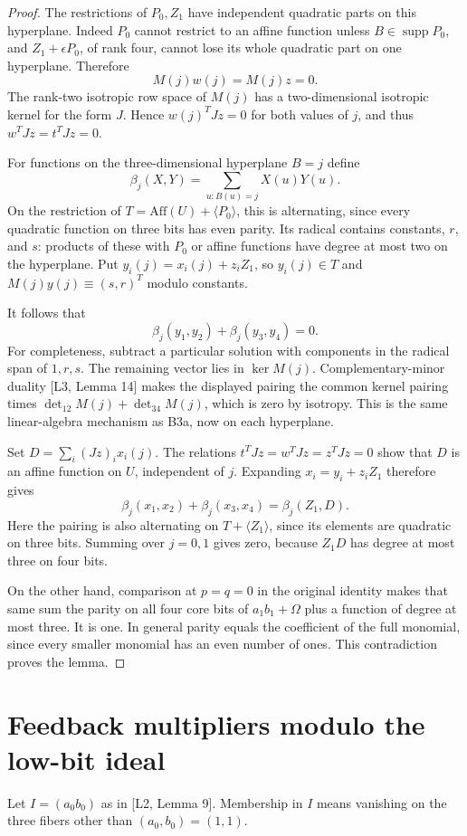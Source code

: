 \documentclass[11pt,a4paper]{article}
\newcommand{\Aff}{\mathrm{Aff}}
\newcommand{\supp}{\operatorname{supp}}
\begin{document}
\begin{proof}
The restrictions of $P_0,Z_1$ have independent quadratic parts on this hyperplane. Indeed $P_0$ cannot restrict to an affine function unless $B\in\supp P_0$, and $Z_1+\epsilon P_0$, of rank four, cannot lose its whole quadratic part on one hyperplane. Therefore
\[
M(j)w(j)=M(j)z=0.
\]
The rank-two isotropic row space of $M(j)$ has a two-dimensional isotropic kernel for the form $J$. Hence $w(j)^TJz=0$ for both values of $j$, and thus $w^TJz=t^TJz=0$.

For functions on the three-dimensional hyperplane $B=j$ define
\[
\beta_j(X,Y)=\sum_{u:B(u)=j}X(u)Y(u).
\]
On the restriction of $T=\Aff(U)+\langle P_0\rangle$, this is alternating, since every quadratic function on three bits has even parity. Its radical contains constants, $r$, and $s$: products of these with $P_0$ or affine functions have degree at most two on the hyperplane. Put $y_i(j)=x_i(j)+z_iZ_1$, so $y_i(j)\in T$ and $M(j)y(j)\equiv(s,r)^T$ modulo constants.

It follows that
\[
\beta_j(y_1,y_2)+\beta_j(y_3,y_4)=0.
\]
For completeness, subtract a particular solution with components in the radical span of $1,r,s$. The remaining vector lies in $\ker M(j)$. Complementary-minor duality [L3, Lemma 14] makes the displayed pairing the common kernel pairing times $\det_{12}M(j)+\det_{34}M(j)$, which is zero by isotropy. This is the same linear-algebra mechanism as B3a, now on each hyperplane.

Set $D=\sum_i(Jz)_i x_i(j)$. The relations $t^TJz=w^TJz=z^TJz=0$ show that $D$ is an affine function on $U$, independent of $j$. Expanding $x_i=y_i+z_iZ_1$ therefore gives
\[
\beta_j(x_1,x_2)+\beta_j(x_3,x_4)=\beta_j(Z_1,D).
\]
Here the pairing is also alternating on $T+\langle Z_1\rangle$, since its elements are quadratic on three bits. Summing over $j=0,1$ gives zero, because $Z_1D$ has degree at most three on four bits.

On the other hand, comparison at $p=q=0$ in the original identity makes that same sum the parity on all four core bits of $a_1b_1+\Omega$ plus a function of degree at most three. It is one. In general parity equals the coefficient of the full monomial, since every smaller monomial has an even number of ones. This contradiction proves the lemma.
\end{proof}

\section{Feedback multipliers modulo the low-bit ideal}
Let $I=(a_0b_0)$ as in [L2, Lemma 9]. Membership in $I$ means vanishing on the three fibers other than $(a_0,b_0)=(1,1)$.
\end{document}
